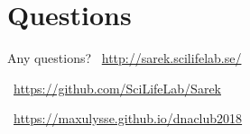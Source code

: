 \documentclass[usepdftitle=false]{beamer}
\begin{document}
{
	\section{Questions}
	\begin{frame}[plain]{Any questions?}
	\vspace{-6cm}
	\faGlobe\ \url{http://sarek.scilifelab.se/}

	\faGithub\ \url{https://github.com/SciLifeLab/Sarek}

	\faGlobe\ \url{https://maxulysse.github.io/dnaclub2018}
	\end{frame}
}
\end{document}
